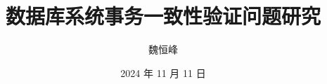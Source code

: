 \documentclass[]{beamer}
\title[]{数据库系统事务一致性验证问题研究}
\subtitle{\teal{(工业软件产教联合主题交流会)}}
\author[魏恒峰]{魏恒峰}
\institute{hfwei@nju.edu.cn}
\date{2024 年 11 月 11 日}
\begin{document}
\maketitle



\thankyou{}
\end{document}
